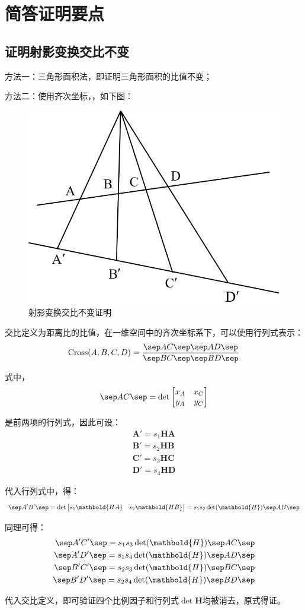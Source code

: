 \documentclass[11pt]{article}
\begin{document}
\section{简答证明要点}
\subsection{证明射影变换交比不变}
方法一：三角形面积法，即证明三角形面积的比值不变；\par
方法二：使用齐次坐标，，如下图：
\begin{figure}[H]
  \centering
  \includegraphics[width=0.3\linewidth]{证明题1.png}
  \caption{射影变换交比不变证明}
\end{figure}\par
交比定义为距离比的比值，在一维空间中的齐次坐标系下，可以使用行列式表示：
$$
  \mathrm{Cross}(A,B,C,D)=\frac{
    \sep AC\sep \sep AD\sep
  }{\sep BC\sep \sep BD\sep }
$$\par
式中，
$$
  \sep AC\sep =\det\begin{bmatrix}
    x_A & x_C \\
    y_A & y_C \\
  \end{bmatrix}
$$\par
是前两项的行列式，因此可设：
$$
  \begin{aligned}
    \mathbold{A}'=s_1\mathbold{HA} \\
    \mathbold{B}'=s_2\mathbold{HB} \\
    \mathbold{C}'=s_3\mathbold{HC} \\
    \mathbold{D}'=s_4\mathbold{HD}
  \end{aligned}
$$\par
代入行列式中，得：
$$
  \begin{aligned}
    \sep A'B'\sep =\det\begin{bmatrix}
                         s_1\mathbold{HA} & s_2\mathbold{HB}
                       \end{bmatrix}=s_1s_2\det(\mathbold{H})\sep AB\sep
  \end{aligned}
$$\par
同理可得：
$$
  \begin{aligned}
    \sep A'C'\sep =s_1s_3\det(\mathbold{H})\sep AC\sep \\
    \sep A'D'\sep =s_1s_4\det(\mathbold{H})\sep AD\sep \\
    \sep B'C'\sep =s_2s_3\det(\mathbold{H})\sep BC\sep \\
    \sep B'D'\sep =s_2s_4\det(\mathbold{H})\sep BD\sep \\
  \end{aligned}
$$\par
代入交比定义，即可验证四个比例因子和行列式$\det\mathbold{H}$均被消去，原式得证。
\end{document}
